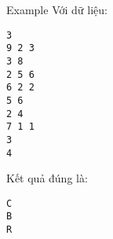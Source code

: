 Example
Với dữ liệu:  
\begin{verbatim}
3
9 2 3
3 8
2 5 6
6 2 2
5 6
2 4
7 1 1
3
4
\end{verbatim}

   Kết quả đúng là:  
\begin{verbatim}
C
B
R
\end{verbatim}